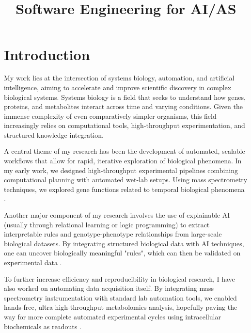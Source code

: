 \documentclass[11pt,compsoc,a4paper]{IEEEtran}
\begin{document}
\onecolumn

\title{Software Engineering for AI/AS}

\author{
}

\maketitle

\section{Introduction}

My work lies at the intersection of systems biology, automation, and artificial intelligence, aiming to accelerate and improve scientific discovery in complex biological systems. Systems biology is a field that seeks to understand how genes, proteins, and metabolites interact across time and varying conditions. Given the immense complexity of even comparatively simpler organisms, this field increasingly relies on computational tools, high-throughput experimentation, and structured knowledge integration.

A central theme of my research has been the development of automated, scalable workflows that allow for rapid, iterative exploration of biological phenomena. In my early work, we designed high-throughput experimental pipelines combining computational planning with automated wet-lab setups. Using mass spectrometry techniques, we explored gene functions related to temporal biological phenomena \cite{brunnsaker2023highthroughput}.

Another major component of my research involves the use of explainable AI (usually through relational learning or logic programming) to extract interpretable rules and genotype-phenotype relationships from large-scale biological datasets. By integrating structured biological data with AI techniques, one can uncover biologically meaningful "rules", which can then be validated on experimental data \cite{brunnsaker2024interpreting}.

To further increase efficiency and reproducibility in biological research, I have also worked on automating data acquisition itself. By integrating mass spectrometry instrumentation with standard lab automation tools, we enabled hands-free, ultra high-throughput metabolomics analysis, hopefully paving the way for more complete automated experimental cycles using intracellular biochemicals as readouts \cite{reder2024autonoms}.
\end{document}
